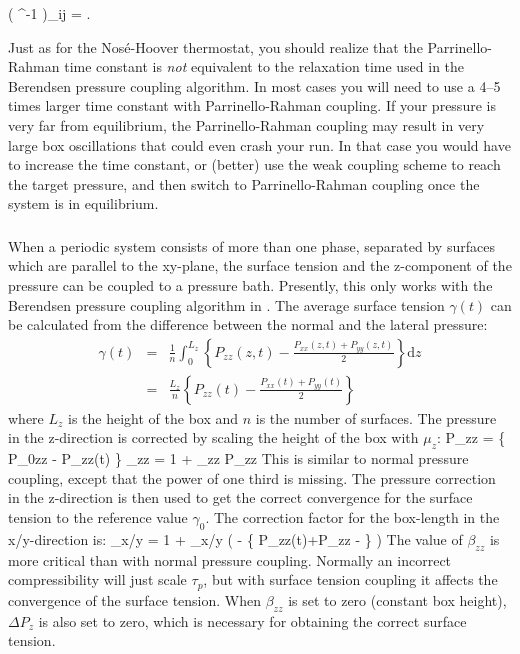 {\beq
\left( ^{-1} \right)_{ij} = .
\eeq

Just as for the Nos\'e-Hoover thermostat, you should realize that
the Parrinello-Rahman time constant is {\em not} equivalent to the 
relaxation time used in the Berendsen pressure coupling algorithm. 
In most cases you will need to use a 4--5
times larger time constant with Parrinello-Rahman coupling. If
your pressure is very far from equilibrium, the Parrinello-Rahman
coupling may result in very
large box oscillations that could even crash your run. 
In that case you would have to increase the time constant, or (better)
use the weak coupling scheme to reach the target pressure, and then
switch to Parrinello-Rahman coupling once the system is in equilibrium.


\subsubsection{}
When a periodic system consists of more than one phase, separated by
surfaces which are parallel to the xy-plane,
the surface tension and the z-component of the pressure can be coupled
to a pressure bath. Presently, this only works with the Berendsen
pressure coupling algorithm in {\gromacs}.
The average surface tension $\gamma(t)$ can be calculated from
the difference between the normal and the lateral pressure:
\begin{eqnarray}
\gamma(t) & = & 
\frac{1}{n} \int_0^{L_z}
\left\{ P_{zz}(z,t) - \frac{P_{xx}(z,t) + P_{yy}(z,t)}{2} \right\} \mbox{d}z \\
& = &
\frac{L_z}{n} \left\{ P_{zz}(t) - \frac{P_{xx}(t) + P_{yy}(t)}{2} \right\}
\end{eqnarray}
where $L_z$ is the height of the box and $n$ is the number of surfaces.
The pressure in the z-direction is corrected by scaling the height of
the box with $\mu_z$:
\beq
\Delta P_{zz} =  \{ P_{0zz} - P_{zz}(t) \}
\eeq
\beq
\mu_{zz} = 1 + \beta_{zz} \Delta P_{zz}
\eeq
This is similar to normal pressure coupling, except that the power
of one third is missing. 
The pressure correction in the z-direction is then used to get the
correct convergence for the surface tension to the reference value $\gamma_0$.
The correction factor for the box-length in the x/y-direction is:
\beq
\mu_{x/y} = 1 +  \beta_{x/y}
        \left( 
        - \left\{ P_{zz}(t)+\Delta P_{zz} -  \right\} 
        \right)
\eeq
The value of $\beta_{zz}$ is more critical than with normal pressure
coupling. Normally an incorrect compressibility will just scale $\tau_p$,
but with surface tension coupling it affects the convergence of the surface
tension. 
When $\beta_{zz}$ is set to zero (constant box height), $\Delta P_z$ is also set
to zero, which is necessary for obtaining the correct surface tension. 
} %

